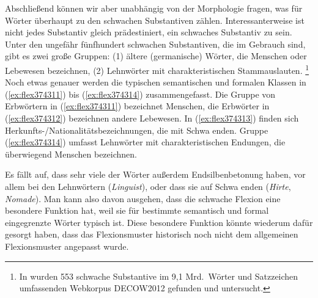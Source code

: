 Abschließend können wir aber unabhängig von der Morphologie fragen, was für Wörter überhaupt zu den schwachen Substantiven zählen.
Interessanterweise ist nicht jedes Substantiv gleich prädestiniert, ein schwaches Substantiv zu sein.
Unter den ungefähr fünfhundert schwachen Substantiven, die im Gebrauch sind, gibt es zwei große Gruppen:
(1) ältere (germanische) Wörter, die Menschen oder Lebewesen bezeichnen,
(2) Lehnwörter mit charakteristischen Stammauslauten.%
\footnote{In \citet{Schaefer2016c} wurden 553 schwache Substantive im 9,1 Mrd.\ Wörter und Satzzeichen umfassenden Webkorpus DECOW2012 gefunden und untersucht.}
Noch etwas genauer werden die typischen semantischen und formalen Klassen in (\ref{ex:flex374311}) bis (\ref{ex:flex374314}) zusammengefasst.
Die Gruppe von Erbwörtern in (\ref{ex:flex374311}) bezeichnet Menschen, die Erbwörter in (\ref{ex:flex374312}) bezeichnen andere Lebewesen.
In (\ref{ex:flex374313}) finden sich Herkunfts-\slash Nationalitätsbezeichnungen, die mit Schwa enden.
Gruppe (\ref{ex:flex374314}) umfasst Lehnwörter mit charakteristischen Endungen, die überwiegend Menschen bezeichnen.

\begin{exe}
\end{exe}

Es fällt auf, dass sehr viele der Wörter außerdem Endsilbenbetonung haben, vor allem bei den Lehnwörtern (\textit{Lingu\Akz ist}), oder dass sie auf Schwa enden (\textit{Hirte}, \textit{Nomade}).
Man kann also davon ausgehen, dass die schwache Flexion eine besondere Funktion hat, weil sie für bestimmte semantisch und formal eingegrenzte Wörter typisch ist.
Diese besondere Funktion könnte wiederum dafür gesorgt haben, dass das Flexionsmuster historisch noch nicht dem allgemeinen Flexionsmuster angepasst wurde.


